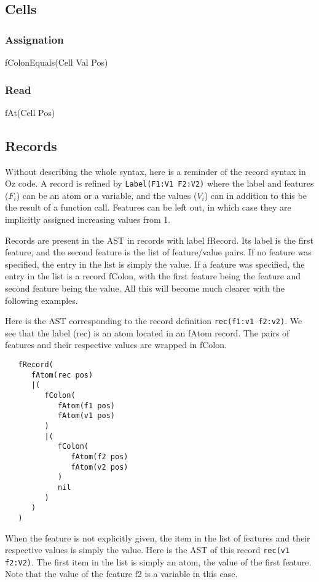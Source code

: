 \documentclass[a4paper]{memoir}
\begin{document}
\subsection{Cells}\label{sec:input:cells}
\subsubsection{Assignation}
fColonEquals(Cell Val Pos) %
\subsubsection{Read}
fAt(Cell Pos) %
\subsection{Records}\label{sec:input:records}
Without describing the whole syntax, here is a reminder of the record syntax in Oz code. A record is refined by \lstinline!Label(F1:V1 F2:V2)! where the label and features ($F_i$) can be an atom or a variable, and the values ($V_i$) can in addition to this be the result of a function call. Features can be left out, in which case they are implicitly assigned increasing values from 1.

Records are present in the AST in records with label fRecord. Its label is the first feature, and the second feature is the list of feature/value pairs. If no feature was specified, the entry in the list is simply the value. If a feature was specified, the entry in the list is a record fColon, with the first feature being the feature and second feature being the value. All this will become much clearer with the following examples.

Here is the AST corresponding to the record definition \lstinline!rec(f1:v1 f2:v2)!. We see that the label (rec) is an atom located in an fAtom record. The pairs of features and their respective values are wrapped in fColon.

\begin{lstlisting}
   fRecord(
      fAtom(rec pos)
      |(
         fColon(
            fAtom(f1 pos)
            fAtom(v1 pos)
         )
         |(
            fColon(
               fAtom(f2 pos)
               fAtom(v2 pos)
            )
            nil
         )
      )
   )
\end{lstlisting}

When the feature is not explicitly given, the item in the list of features and their respective values is simply the value. Here is the AST of this record \lstinline!rec(v1 f2:V2)!. The first item in the list is simply an atom, the value of the first feature. Note that the value of the feature f2 is a variable in this case.
\end{document}
